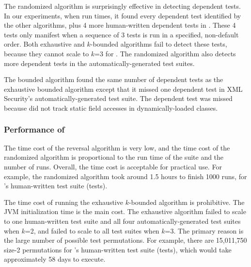 The randomized algorithm is surprisingly effective in
detecting dependent tests. In our experiments, when run \trialnum times,
it found every
dependent test identified by the other algorithms, plus 
4 more human-written dependent
tests in \jt. These 4 tests only
manifest when a sequence of 3 tests is run in a specified,
non-default order. Both exhaustive and \dependenceaware{} $k$-bounded
algorithms fail to detect these tests, because
they cannot scale to $k$=3 for 
\jt.  The randomized algorithm also
detects more dependent
tests in the automatically-generated test suites.

The \dependenceaware{} bounded algorithm found the same
number of dependent tests as the exhaustive bounded algorithm
except that it missed one dependent test in XML Security's
automatically-generated test suite.
The dependent test was missed because \ourtool
did not track static field accesses in dynamically-loaded
classes.


\subsubsection{Performance of \ourtool}
\label{sec:performance}

The time cost of the reversal algorithm is very low, and
the time cost of the randomized algorithm 
is proportional to the run time of the suite and the number of runs.
Overall, the time cost is acceptable for practical use.
For example, the randomized algorithm took around 1.5 hours
to finish 1000 runs,  for \jt's human-written test
suite (\jodatimetests tests).
 
The time cost of running the exhaustive $k$-bounded algorithm
is prohibitive. The JVM initialization time is the main cost.
The exhaustive algorithm failed to
scale to one human-written test suite and all four automatically-generated
test suites when $k$=2, and failed to scale to all test suites
when $k$=3. The primary reason is the large
number of possible test permutations. 
For example, there are 15,011,750 size-2 permutations
for \jt's human-written test suite (\jodatimetests tests),
which would take approximately 58 days to execute.

